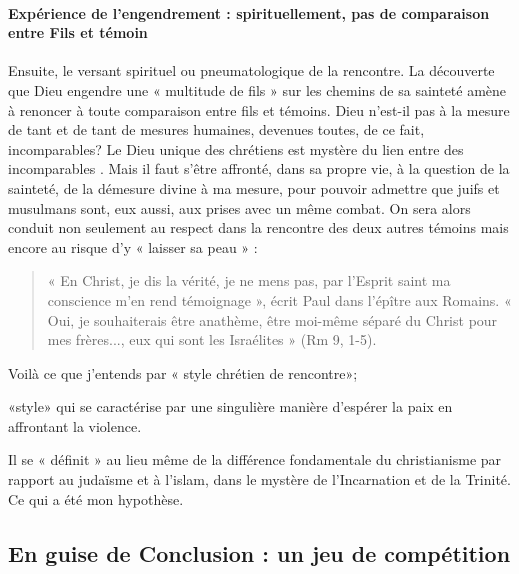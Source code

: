 \paragraph{Expérience de l'engendrement : spirituellement, pas de comparaison entre Fils et témoin }
Ensuite, le versant spirituel ou pneumatologique de la rencontre. La découverte que Dieu engendre une « multitude de fils » sur les chemins de sa sainteté amène à renoncer à toute comparaison entre fils et témoins. Dieu n'est-il pas à la mesure de tant et de tant de mesures humaines, devenues toutes, de ce fait, incomparables? Le Dieu unique des chrétiens est mystère du lien entre des incomparables . Mais il faut s'être affronté, dans sa propre  vie, à la question de la sainteté, de la démesure divine à ma mesure, pour pouvoir admettre que juifs et musulmans sont, eux aussi, aux prises avec un même combat. On sera alors conduit non seulement au respect dans la rencontre des deux autres témoins mais encore au risque d'y « laisser sa peau » : \begin{quote}
    « En Christ, je dis la vérité, je ne mens  pas, par l'Esprit saint ma conscience m'en rend témoignage », écrit Paul dans l'épître aux Romains. « Oui, je souhaiterais être anathème, être moi-même séparé du Christ pour mes frères..., eux qui sont les Israélites » (Rm 9, 1-5).
\end{quote}
Voilà ce que j'entends par « style chrétien de rencontre»; 
\begin{Def}
    «style» qui se caractérise par une singulière manière d'espérer la paix en affrontant la violence. 
\end{Def}
Il se « définit » au lieu même de la différence fondamentale du christianisme par rapport au judaïsme et à l'islam, dans le mystère de l'Incarnation et de la Trinité. Ce qui a été mon hypothèse.

\subsection{En guise de Conclusion : un jeu de compétition}

